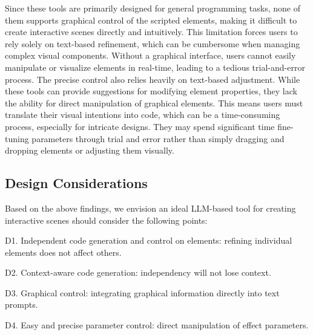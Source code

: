 Since these tools are primarily designed for general programming tasks, none of them supports graphical control of the scripted elements, making it difficult to create interactive scenes directly and intuitively. This limitation forces users to rely solely on text-based refinement, which can be cumbersome when managing complex visual components. Without a graphical interface, users cannot easily manipulate or visualize elements in real-time, leading to a tedious trial-and-error process. The precise control also relies heavily on text-based adjustment. While these tools can provide suggestions for modifying {element} properties, %
they lack the ability for direct manipulation of graphical elements. This means users must translate their visual intentions into code, which can be a time-consuming process, especially for intricate designs. They may spend significant time fine-tuning parameters through trial and error rather than simply dragging and dropping elements or adjusting them visually. 




\subsection{Design Considerations}
\label{sec:design_consideration}
Based on the above findings, we envision an ideal LLM-based tool for creating interactive scenes should consider the following points:

D1. Independent {code} generation and control on elements: refining individual elements does not affect others.

D2. Context-aware code generation: independency will not lose context.

D3. Graphical control: 
integrating graphical information directly into text prompts.

D4. Easy and precise parameter control: direct manipulation of effect parameters.


